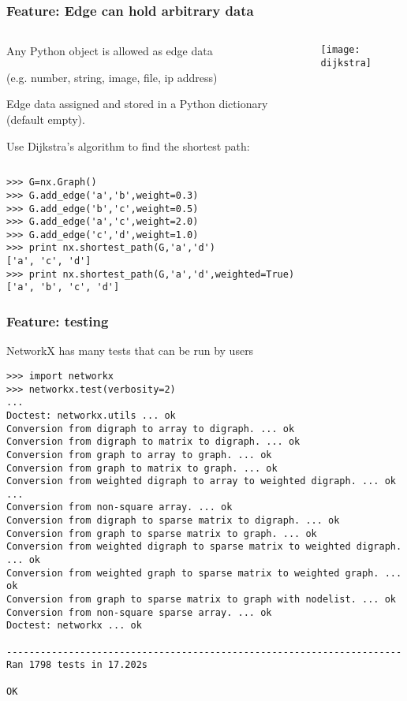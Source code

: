 \begin{frame}[fragile]
\frametitle{Feature: Edge can hold arbitrary data}

\begin{columns}[T]

\begin{column}{0.7\textwidth}
Any Python object is allowed as edge data

(e.g. number, string, image, file, ip address)

Edge data assigned and stored in a Python dictionary (default empty).

\bigskip
Use Dijkstra's algorithm to find the shortest path:

\end{column}

\begin{column}{0.3\textwidth}
\centerline{\texttt{[image: dijkstra]}}
\end{column}
\end{columns}

\begin{block}{}
\begin{verbatim}
>>> G=nx.Graph()
>>> G.add_edge('a','b',weight=0.3)
>>> G.add_edge('b','c',weight=0.5)
>>> G.add_edge('a','c',weight=2.0)
>>> G.add_edge('c','d',weight=1.0)
>>> print nx.shortest_path(G,'a','d')
['a', 'c', 'd']
>>> print nx.shortest_path(G,'a','d',weighted=True)
['a', 'b', 'c', 'd']
\end{verbatim}
\end{block}

\end{frame}



\begin{frame}[fragile]
\frametitle{Feature: testing}
NetworkX has many tests that can be run by users
\footnotesize
\begin{block}{}
\begin{verbatim}
>>> import networkx
>>> networkx.test(verbosity=2)
...
Doctest: networkx.utils ... ok
Conversion from digraph to array to digraph. ... ok
Conversion from digraph to matrix to digraph. ... ok
Conversion from graph to array to graph. ... ok
Conversion from graph to matrix to graph. ... ok
Conversion from weighted digraph to array to weighted digraph. ... ok
...
Conversion from non-square array. ... ok
Conversion from digraph to sparse matrix to digraph. ... ok
Conversion from graph to sparse matrix to graph. ... ok
Conversion from weighted digraph to sparse matrix to weighted digraph. ... ok
Conversion from weighted graph to sparse matrix to weighted graph. ... ok
Conversion from graph to sparse matrix to graph with nodelist. ... ok
Conversion from non-square sparse array. ... ok
Doctest: networkx ... ok

----------------------------------------------------------------------
Ran 1798 tests in 17.202s

OK
\end{verbatim}
\end{block}
\end{frame}

